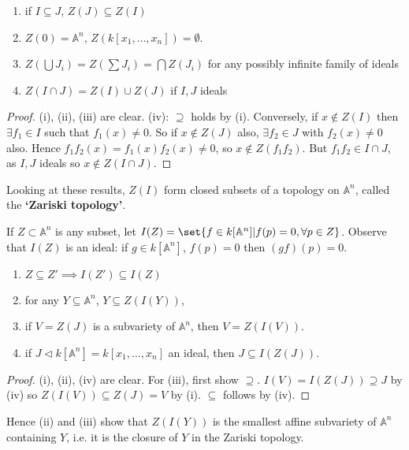 \documentclass{article}
\newcommand{\A}{\mathbb{A}}
\begin{document}
\begin{lemma}
    \leavevmode
    \begin{enumerate}[label=(\roman*)]
        \item if $I \subseteq J$, $Z(J) \subseteq Z(I)$
        \item $Z(0) = \A^n$, $Z(k[x_1, \dotsc, x_n]) = \emptyset$.
        \item $Z\left(\bigcup J_i\right) = Z(\sum J_i) = \bigcap Z(J_i)$ for any possibly infinite family of ideals
        \item $Z(I \cap J) = Z(I) \cup Z(J)$ if $I, J$ ideals
    \end{enumerate}
\end{lemma}
\begin{proof}
    (i), (ii), (iii) are clear.
    (iv): $\supseteq$ holds by (i). Conversely, if $x \notin Z(I)$ then $\exists f_1 \in I$ such that $f_1(x) \neq 0$.
    So if $x \notin Z(J)$ also, $\exists f_2 \in J$ with $f_2(x) \neq 0$ also.
    Hence $f_1 f_2(x) = f_1(x) f_2(x) \neq 0$, so $x \notin Z(f_1 f_2)$. But $f_1 f_2 \in I \cap J$, as $I, J$ ideals so $x \notin Z(I \cap J)$.
\end{proof}

Looking at these results, $Z(I)$ form closed subsets of a topology on $\A^n$, called the \hypertarget{def:zariski}{\textbf{`Zariski topology'}}.

If $Z \subset \A^n$ is any subset, let $I(Z) = \set{f \in k[\A^n] | f(p) = 0, \forall p \in Z}$.
Observe that $I(Z)$ is an ideal: if $g \in k[\A^n]$, $f(p) = 0$ then $(gf)(p) = 0$.
\begin{lemma}
    \leavevmode
    \begin{enumerate}[label=(\roman*)]
        \item $Z \subseteq Z' \implies I(Z') \subseteq I(Z)$
        \item for any $Y \subseteq \A^n$, $Y \subseteq Z(I(Y))$,
        \item if $V = Z(J)$ is a subvariety of $\A^n$, then $V = Z(I(V))$.
        \item if $J \lhd k[\A^n] = k[x_1, \dotsc, x_n]$ an ideal, then $J \subseteq I(Z(J))$.
    \end{enumerate}
\end{lemma}
\begin{proof}
    (i), (ii), (iv) are clear.
    For (iii), first show $\supseteq$. $I(V) = I(Z(J))\supseteq J$ by (iv) so $Z(I(V)) \subseteq Z(J)=V$ by (i). $\subseteq$ follows by (iv).
\end{proof}
Hence (ii) and (iii) show that $Z(I(Y))$ is the smallest affine subvariety of $\A^n$ containing $Y$, i.e. it is the closure of $Y$ in the Zariski topology.
\end{document}
